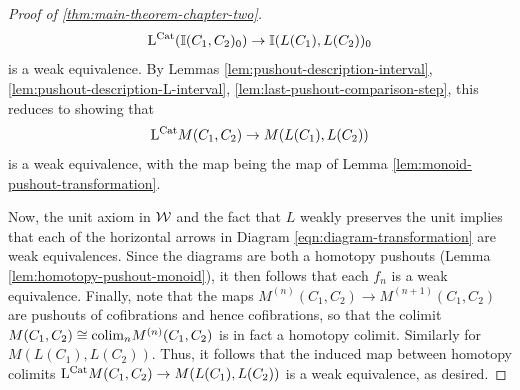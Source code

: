 \documentclass[12pt]{amsart}
\begin{document}
\begin{proof}[Proof of \ref{thm:main-theorem-chapter-two}]
	$$\mathrm{L}^{\mathrm{Cat}}(\mathbb{I}(C_1,C_2 )_0) \to \mathbb{I}(L(C_1), L(C_2))_0$$
	is a weak equivalence. 
	By Lemmas \ref{lem:pushout-description-interval}, \ref{lem:pushout-description-L-interval}, \ref{lem:last-pushout-comparison-step}, this reduces to showing that 
	$$\mathrm{L}^{\mathrm{Cat}} M(C_1,C_2) \to M(L(C_1),L(C_2))$$
	is a weak equivalence, with the map being the map of Lemma \ref{lem:monoid-pushout-transformation}.
	\par
	Now, the unit axiom in $\mathcal{W}$ and the fact that $L$ weakly preserves the unit implies that each of the horizontal arrows in Diagram \eqref{eqn:diagram-transformation} are weak equivalences.
	Since the diagrams are both a homotopy pushouts (Lemma \ref{lem:homotopy-pushout-monoid}), it then follows that each $f_n$ is a weak equivalence. 
	Finally, note that the maps $M^{(n)}(C_1,C_2) \to M^{(n+1)}(C_1,C_2)$ are pushouts of cofibrations and hence cofibrations, so that the colimit $M(C_1,C_2) \cong \mathrm{colim}_n M^{(n)}(C_1,C_2)$ is in fact a homotopy colimit. Similarly for $M(L(C_1),L(C_2))$. 
	Thus, it follows that the induced map between homotopy colimits $\mathrm{L}^{\mathrm{Cat}} M(C_1,C_2) \to M(L(C_1),L(C_2))$ is a weak equivalence, as desired.
\end{proof}
\end{document}
